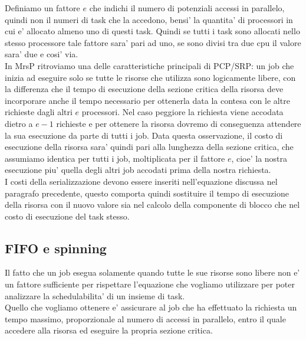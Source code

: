 \documentclass[a4paper,11pt]{article}
\begin{document}
\noindent Definiamo un fattore $e$ che indichi il numero di potenziali accessi in parallelo, quindi non il numeri di task che la accedono, bensi' la quantita' di processori in cui e' allocato almeno uno di questi task. Quindi se tutti i task sono allocati nello stesso processore tale fattore sara' pari ad uno, se sono divisi tra due cpu il valore sara' due e cosi' via.\\

\noindent In MrsP ritroviamo una delle caratteristiche principali di PCP/SRP: un job che inizia ad eseguire solo se tutte le risorse che utilizza sono logicamente libere, con la differenza che il tempo di esecuzione della sezione critica della risorsa deve incorporare anche il tempo necessario per ottenerla data la contesa con le altre richieste dagli altri $e$ processori. Nel caso peggiore la richiesta viene accodata dietro a $e - 1$ richieste e per ottenere la risorsa dovremo di conseguenza attendere la sua esecuzione da parte di tutti i job. Data questa osservazione, il costo di esecuzione della risorsa sara' quindi pari alla lunghezza della sezione critica, che assumiamo identica per tutti i job, moltiplicata per il fattore $e$, cioe' la nostra esecuzione piu' quella degli altri job accodati prima della nostra richiesta.\\

\noindent I costi della serializzazione devono essere inseriti nell'equazione discussa nel paragrafo precedente, questo comporta quindi sostituire il tempo di esecuzione della risorsa con il nuovo valore sia nel calcolo della componente di blocco che nel costo di esecuzione del task stesso.\\

\subsection{FIFO e spinning}

\noindent Il fatto che un job esegua solamente quando tutte le sue risorse sono libere non e' un fattore sufficiente per rispettare l'equazione che vogliamo utilizzare per poter analizzare la schedulabilita' di un insieme di task.\\

\noindent Quello che vogliamo ottenere e' assicurare al job che ha effettuato la richiesta un tempo massimo, proporzionale al numero di accessi in parallelo, entro il quale accedere alla risorsa ed eseguire la propria sezione critica.\\
\end{document}
